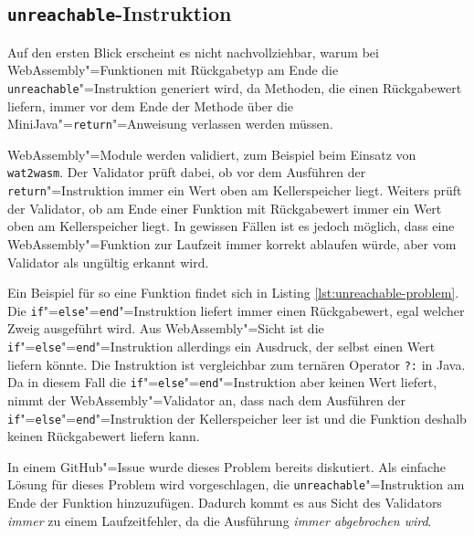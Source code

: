 

\pagebreak
\subsection{\lstinline{unreachable}-Instruktion}
Auf den ersten Blick erscheint es nicht nachvollziehbar, warum bei WebAssembly"=Funktionen mit Rückgabetyp am Ende die \lstinline{unreachable}"=Instruktion generiert wird, da Methoden, die einen Rückgabewert liefern, immer vor dem Ende der Methode über die MiniJava"=\lstinline{return}"=Anweisung verlassen werden müssen.

WebAssembly"=Module werden validiert, zum Beispiel beim Einsatz von \lstinline{wat2wasm}. Der Validator prüft dabei, ob vor dem Ausführen der \lstinline{return}"=Instruktion immer ein Wert oben am Kellerspeicher liegt. Weiters prüft der Validator, ob am Ende einer Funktion mit Rückgabewert immer ein Wert oben am Kellerspeicher liegt. In gewissen Fällen ist es jedoch möglich, dass eine WebAssembly"=Funktion zur Laufzeit immer korrekt ablaufen würde, aber vom Validator als ungültig erkannt wird.

Ein Beispiel für so eine Funktion findet sich in Listing \ref{lst:unreachable-problem}. Die \lstinline{if}"=\lstinline{else}"=\lstinline{end}"=Instruktion liefert immer einen Rückgabewert, egal welcher Zweig ausgeführt wird. Aus WebAssembly"=Sicht ist die \lstinline{if}"=\lstinline{else}"=\lstinline{end}"=Instruktion allerdings ein Ausdruck, der selbst einen Wert liefern könnte. Die Instruktion ist vergleichbar zum ternären Operator \lstinline{?:} in Java. Da in diesem Fall die \lstinline{if}"=\lstinline{else}"=\lstinline{end}"=Instruktion aber keinen Wert liefert, nimmt der WebAssembly"=Validator an, dass nach dem Ausführen der \lstinline{if}"=\lstinline{else}"=\lstinline{end}"=Instruktion der Kellerspeicher leer ist und die Funktion deshalb keinen Rückgabewert liefern kann.



In einem GitHub"=Issue \cite{WebAssemblyUnreachableWorkaround} wurde dieses Problem bereits diskutiert. Als einfache Lösung für dieses Problem wird vorgeschlagen, die \lstinline{unreachable}"=Instruktion am Ende der Funktion hinzuzufügen. Dadurch kommt es aus Sicht des Validators \emph{immer} zu einem Laufzeitfehler, da die Ausführung \emph{immer abgebrochen wird}.

